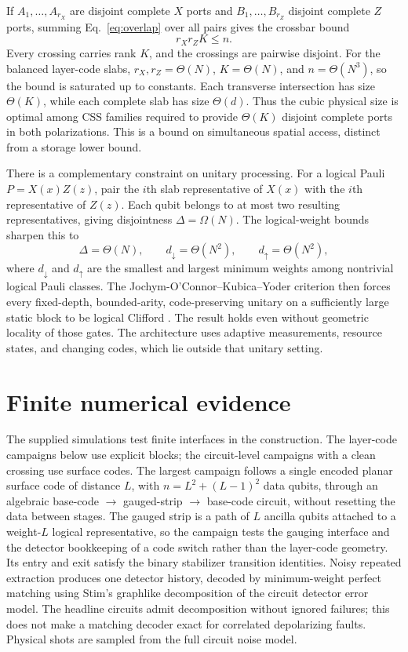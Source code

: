 If $A_1,\ldots,A_{r_X}$ are disjoint complete $X$ ports and
$B_1,\ldots,B_{r_Z}$ disjoint complete $Z$ ports, summing
Eq.~\eqref{eq:overlap} over all pairs gives the crossbar bound
\begin{equation}
 r_Xr_ZK\le n.
 \label{eq:crossbar}
\end{equation}
Every crossing carries rank $K$, and the crossings are pairwise disjoint.
For the balanced layer-code slabs,
$r_X,r_Z=\Theta(N)$, $K=\Theta(N)$, and $n=\Theta(N^3)$, so the bound is
saturated up to constants. Each transverse intersection has size
$\Theta(K)$, while each complete slab has size $\Theta(d)$. Thus the cubic
physical size is optimal among CSS families required to provide
$\Theta(K)$ disjoint complete ports in both polarizations. This is a bound
on simultaneous spatial access, distinct from a storage lower bound.

There is a complementary constraint on unitary processing. For a logical
Pauli $P=X(x)Z(z)$, pair the $i$th slab representative of $X(x)$ with the
$i$th representative of $Z(z)$. Each qubit belongs to at most two resulting representatives, giving
disjointness $\Delta=\Omega(N)$. The logical-weight bounds sharpen this to
\begin{equation}
 \Delta=\Theta(N),\qquad
 d_\downarrow=\Theta(N^2),\qquad d_\uparrow=\Theta(N^2),
 \label{eq:disjoint}
\end{equation}
where $d_\downarrow$ and $d_\uparrow$ are the smallest and largest minimum
weights among nontrivial logical Pauli classes. The
Jochym-O'Connor--Kubica--Yoder criterion then forces every fixed-depth,
bounded-arity, code-preserving unitary on a sufficiently large static block
to be logical Clifford \cite{JochymDisjointness}. The result holds even
without geometric locality of those gates. The architecture uses adaptive
measurements, resource states, and changing codes, which lie outside that
unitary setting.

\section{Finite numerical evidence}
\label{sec:numerics-main}
The supplied simulations test finite interfaces in the construction.  The
layer-code campaigns below use explicit blocks; the circuit-level campaigns with
a clean crossing use surface codes.
The largest campaign follows a single encoded planar surface code of distance
$L$, with $n=L^2+(L-1)^2$ data qubits, through an algebraic base-code
$\rightarrow$ gauged-strip $\rightarrow$ base-code circuit, without
resetting the data between stages. The gauged strip is a path of $L$
ancilla qubits attached to a weight-$L$ logical representative, so the
campaign tests the gauging interface and the detector bookkeeping of a code
switch rather than the layer-code geometry. Its entry and exit satisfy the binary
stabilizer transition identities. Noisy repeated extraction produces one
detector history, decoded by minimum-weight perfect matching using Stim's graphlike
decomposition of the circuit detector error model. The headline circuits
admit decomposition without ignored failures; this does not make a
matching decoder exact for correlated depolarizing faults. Physical shots
are sampled from the full circuit noise model.

